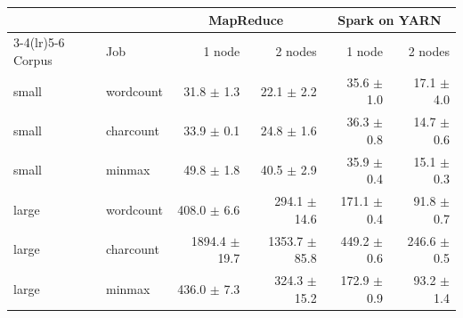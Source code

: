 \begin{tabular}{llrrrr}
\toprule
& & \multicolumn{2}{c}{MapReduce} & \multicolumn{2}{c}{Spark on YARN} \\
\cmidrule(lr){3-4}\cmidrule(lr){5-6}
Corpus & Job & 1 node & 2 nodes & 1 node & 2 nodes \\
\midrule
small & wordcount & 31.8 $\pm$ 1.3 & 22.1 $\pm$ 2.2 & 35.6 $\pm$ 1.0 & 17.1 $\pm$ 4.0 \\
small & charcount & 33.9 $\pm$ 0.1 & 24.8 $\pm$ 1.6 & 36.3 $\pm$ 0.8 & 14.7 $\pm$ 0.6 \\
small & minmax & 49.8 $\pm$ 1.8 & 40.5 $\pm$ 2.9 & 35.9 $\pm$ 0.4 & 15.1 $\pm$ 0.3 \\
large & wordcount & 408.0 $\pm$ 6.6 & 294.1 $\pm$ 14.6 & 171.1 $\pm$ 0.4 & 91.8 $\pm$ 0.7 \\
large & charcount & 1894.4 $\pm$ 19.7 & 1353.7 $\pm$ 85.8 & 449.2 $\pm$ 0.6 & 246.6 $\pm$ 0.5 \\
large & minmax & 436.0 $\pm$ 7.3 & 324.3 $\pm$ 15.2 & 172.9 $\pm$ 0.9 & 93.2 $\pm$ 1.4 \\
\bottomrule
\end{tabular}
